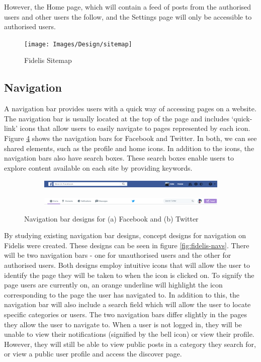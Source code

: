 However, the Home page, which will contain a feed of posts from the authorised users and other users the follow, and the Settings page will only be accessible to authorised users.

\begin{figure}[H]
\centering
\texttt{[image: Images/Design/sitemap]}
\caption{Fidelis Sitemap}
\label{fig:sitemap}
\end{figure}

\subsection{Navigation}
A navigation bar provides users with a quick way of accessing pages on a website. The navigation bar is usually located at the top of the page and includes `quick-link' icons that allow users to easily navigate to pages represented by each icon. Figure \ref{fig:navs} shows the navigation bars for Facebook and Twitter. In both, we can see shared elements, such as the profile and home icons. In addition to the icons, the navigation bars also have search boxes. These search boxes enable users to explore content available on each site by providing keywords.

\begin{figure}[H]
\centering
\begin{subfigure}{1\linewidth}
    \includegraphics[width=1\linewidth]{Images/Design/fb-nav}
    \caption{}
    \label{fig:fb-nav}
\end{subfigure}
\begin{subfigure}{1\linewidth}
    \includegraphics[width=1\linewidth]{Images/Design/twitter-nav}
    \caption{}
    \label{fig:twitter-nav}
\end{subfigure}
\caption{Navigation bar designs for (a) Facebook and (b) Twitter}
\label{fig:navs}
\end{figure}

By studying existing navigation bar designs, concept designs for navigation on Fidelis were created. These designs can be seen in figure \ref{fig:fidelis-navs}. There will be two navigation bars - one for unauthorised users and the other for authorised users. Both designs employ intuitive icons that will allow the user to identify the page they will be taken to when the icon is clicked on. To signify the page users are currently on, an orange underline will highlight the icon corresponding to the page the user has navigated to. In addition to this, the navigation bar will also include a search field which will allow the user to locate specific categories or users. The two navigation bars differ slightly in the pages they allow the user to navigate to. When a user is not logged in, they will be unable to view their notifications (signified by the bell icon) or view their profile. However, they will still be able to view public posts in a category they search for, or view a public user profile and access the discover page.

